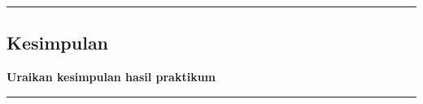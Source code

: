 {\color{gray}\hrule}
\begin{center}
\section{Kesimpulan}
\textbf{Uraikan kesimpulan hasil praktikum}
\end{center}
{\color{gray}\hrule}
\vspace{0.5cm}
\lipsum[1]